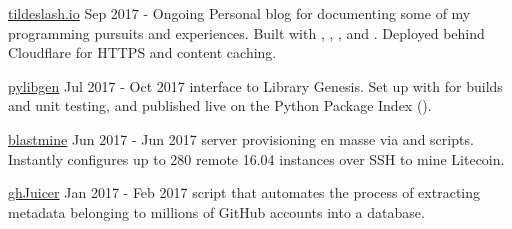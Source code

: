\begin{cventries}
  \cventryProject
    {\href{https://tildeslash.io}{tildeslash.io}}
    {Sep 2017 - Ongoing}
    {
    Personal blog for documenting some of my programming pursuits and experiences. Built with , , , and . Deployed behind Cloudflare for HTTPS and content caching.
    }

  \cventryProject
    {\href{https://github.com/JoshuaRLi/pylibgen}{pylibgen}}
    {Jul 2017 - Oct 2017}
    {
     interface to Library Genesis. Set up with  for builds and unit testing, and published live on the Python Package Index ().
    }

  \cventryProject
    {\href{https://github.com/JoshuaRLi/blastmine}{blastmine}}
    {Jun 2017 - Jun 2017}
    {
     server provisioning en masse via  and  scripts. Instantly configures up to 280 remote  16.04 instances over SSH to mine Litecoin.
    }

  \cventryProject
    {\href{https://github.com/JoshuaRLi/ghJuicer}{ghJuicer}}
    {Jan 2017 - Feb 2017}
    {
     script that automates the process of extracting metadata belonging to millions of GitHub accounts into a  database.
    }

\end{cventries}
